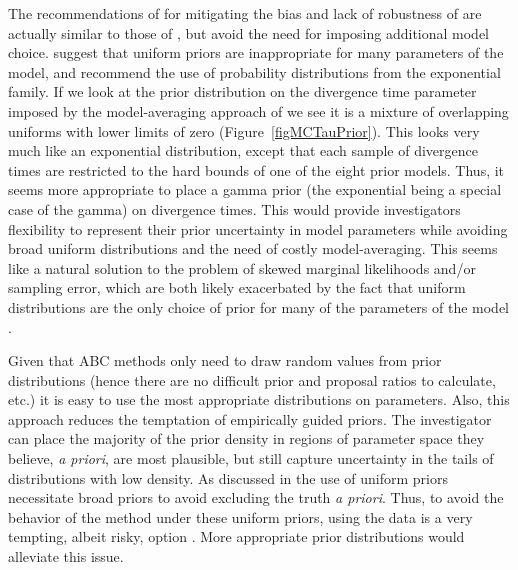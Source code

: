 \documentclass[letterpaper,12pt]{article}
\begin{document}
\begin{linenumbers}
The recommendations of \citet{Oaks2012} for mitigating the bias and lack of
robustness of \msb are actually similar to those of \citet{Hickerson2013}, but
avoid the need for imposing additional model choice.
\citet{Oaks2012} suggest that uniform priors are inappropriate for many
parameters of the \msb model, and recommend the use of probability
distributions from the exponential family.
If we look at the prior distribution on the divergence time parameter \divt{}
imposed by the model-averaging approach of \citet{Hickerson2013} we see
it is a mixture of overlapping uniforms with lower limits of zero
(Figure~\ref{figMCTauPrior}).
This looks very much like an exponential distribution, except that each sample
of divergence times are restricted to the hard bounds of one of the eight prior
models.
Thus, it seems more appropriate to place a gamma prior (the exponential being a
special case of the gamma) on divergence times.
This would provide investigators flexibility to represent their prior
uncertainty in model parameters while avoiding broad uniform
distributions and the need of costly model-averaging.
This seems like a natural solution to the problem of skewed marginal
likelihoods and/or sampling error, which are both likely exacerbated by the
fact that uniform distributions are the only choice of prior for many of the
parameters of the \msb model \citep[\divt{}, \ancestralTheta{},
, , \bottleTime{},
, , \locusRateHetShapeParameter,
\migrationRate{}, \recombinationRate;][]{Oaks2012}.

Given that ABC methods only need to draw random values from prior distributions
(hence there are no difficult prior and proposal ratios to calculate, etc.) it
is easy to use the most appropriate distributions on parameters.
Also, this approach reduces the temptation of empirically guided priors.
The investigator can place the majority of the prior density in regions of
parameter space they believe, \emph{a priori}, are most plausible, but still
capture uncertainty in the tails of distributions with low density.
As discussed in \citet{Oaks2012} the use of uniform priors necessitate
broad priors to avoid excluding the truth \emph{a priori}.
Thus, to avoid the behavior of the method under these uniform priors, using the
data is a very tempting, albeit risky, option \citep{Hickerson2013}.
More appropriate prior distributions would alleviate this issue.




\end{linenumbers}
\end{document}
